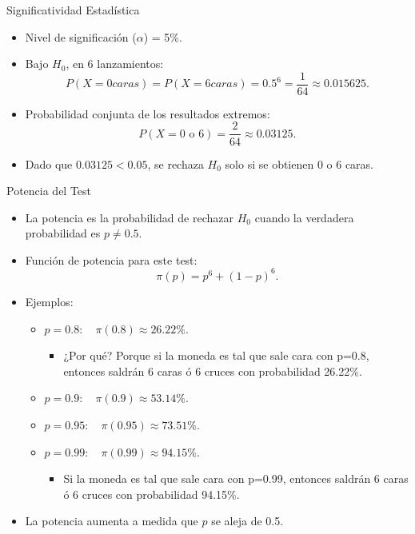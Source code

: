 ﻿\documentclass{beamer}
\begin{document}
\begin{frame}{Significatividad Estadística}
    \begin{itemize}
        \item Nivel de significación (\(\alpha\)) = 5\%.
        \item Bajo \(H_0\), en 6 lanzamientos:
        \[
        P(X=0 caras)=P(X=6 caras)=0.5^6=\frac{1}{64}\approx0.015625.
        \]
        \item Probabilidad conjunta de los resultados extremos:
        \[
        P(X=0 \text{ o } 6)=\frac{2}{64}\approx0.03125.
        \]
        \item Dado que \(0.03125 < 0.05\), se rechaza \(H_0\) solo si se obtienen 0 o 6 caras.
    \end{itemize}
\end{frame}

\begin{frame}{Potencia del Test}
    \begin{itemize}
        \item La potencia es la probabilidad de rechazar \(H_0\) cuando la verdadera probabilidad es \(p \neq 0.5\).
        \item Función de potencia para este test:
        \[
        \pi(p)=p^6+(1-p)^6.
        \]
        \item Ejemplos:
        \begin{itemize}
            \item \(p=0.8:\quad \pi(0.8)\approx26.22\%\). 
             \begin{itemize}
                \item¿Por qué? Porque si la moneda es tal que sale cara con p=0.8, entonces saldrán 6 caras ó 6 cruces con probabilidad 26.22\%.
            \end{itemize}
            \item \(p=0.9:\quad \pi(0.9)\approx53.14\%\).
            \item \(p=0.95:\quad \pi(0.95)\approx73.51\%\).
            \item \(p=0.99:\quad \pi(0.99)\approx94.15\%\).
             \begin{itemize}
                \item Si la moneda es tal que sale cara con p=0.99, entonces saldrán 6 caras ó 6 cruces con probabilidad 94.15\%.
            \end{itemize}
        \end{itemize}
        \item La potencia aumenta a medida que \(p\) se aleja de 0.5.
    \end{itemize}
\end{frame}
\end{document}
